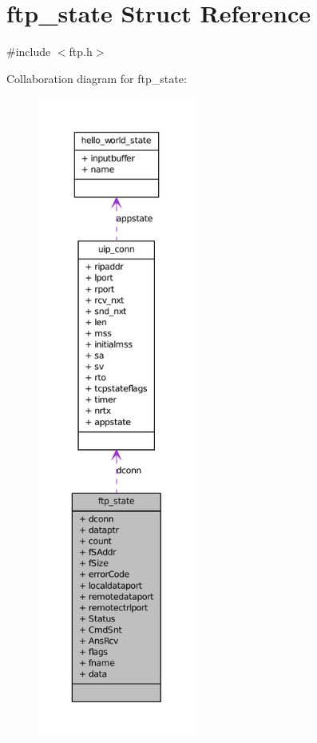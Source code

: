 \hypertarget{structftp__state}{
\section{ftp\_\-state Struct Reference}
\label{structftp__state}
}


{\ttfamily \#include $<$ftp.h$>$}



Collaboration diagram for ftp\_\-state:
\nopagebreak
\begin{figure}[H]
\begin{center}
\leavevmode
\includegraphics[height=600pt]{structftp__state__coll__graph}
\end{center}
\end{figure}
